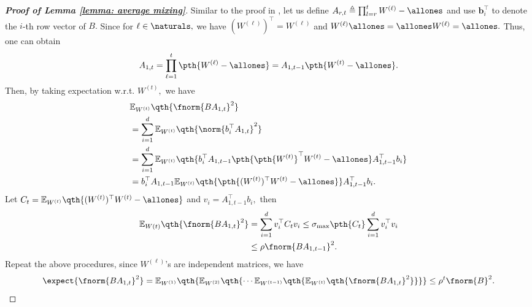 \documentclass[letterpaper, 10 pt, conference]{ieeeconf}  %
\begin{document}
\begin{proof}[\bf Proof of Lemma \ref{lemma: average mixing}]
Similar to the proof in \cite{wang2022matcha}, let us define $A_{r,t}\triangleq \prod_{l=r}^t W^{(\ell)} - \allones$ and use $\bm{b}_i^\top$ to denote the $i$-th row vector of $B.$ 
Since for $\ell\in\naturals,$ we have $(W^{(\ell)})^\top = W^{(\ell)}$ and $W^{(\ell)}\allones = \allones W^{(\ell)} = \allones.$
Thus, one can obtain
\[
A_{1,t} = \prod_{\ell=1}^t \pth{W^{(\ell)} - \allones} = A_{1,t-1}\pth{W^{(t)}-\allones}.
\]
Then, by taking expectation w.r.t. $W^{(t)},$ we have 
\begin{align*}
    & \mathbb{E}_{W^{(t)}}\qth{\fnorm{B A_{1,t}}^2}\\
    & = \sum_{i=1}^d \mathbb{E}_{W^{(t)}}\qth{\norm{b_i^\top A_{1,t}}^2}\\
    & = \sum_{i=1}^d \mathbb{E}_{W^{(t)}}\qth{b_i^\top A_{1,t-1} \pth{\pth{W^{(t)}}^\top W^{(t)} -\allones}A_{1,t-1}^\top b_i}\\
    & = b_i^\top A_{1,t-1}\mathbb{E}_{W^{(t)}}\qth{\pth{(W^{(t)})^\top W^{(t)} -\allones}} A_{1,t-1}^\top b_i.
\end{align*}
Let $C_t = \mathbb{E}_{W^{(t)}}\qth{(W^{(t)})^\top W^{(t)} - \allones}$ and $v_i = A_{1,t-1}^\top b_i,$ then
\begin{align*}
\mathbb{E}_{W(t)}\qth{\fnorm{BA_{1,t}}^2} & 
= \sum_{i=1}^d v_i^\top C_t v_i \le \sigma_{\max}\pth{C_t} \sum_{i=1}^d v_i^\top v_i \\
& \le \rho \fnorm{BA_{1,t-1}}^2.
\end{align*}
Repeat the above procedures, since $W^{(\ell)}$'s are independent matrices, we have
\[
\expect{\fnorm{BA_{1,t}}^2} = 
\mathbb{E}_{W^{(1)}}\qth{\mathbb{E}_{W^{(2)}}\qth{\cdots  \mathbb{E}_{W^{(t-1)}}\qth{ \mathbb{E}_{W^{(t)}}\qth{\fnorm{BA_{1,t}}^2}} } } \le \rho^{t}\fnorm{B}^2.
\]
\end{proof}
\end{document}
